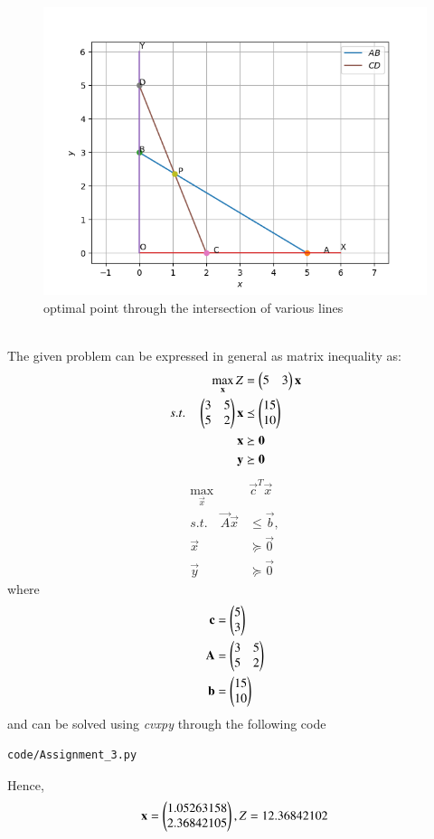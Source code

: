 \documentclass[journal,12pt,twocolumn]{IEEEtran}
\begin{document}
\begin{figure}[h]
\includegraphics[width=\columnwidth]{Figure_1.png}
\caption{optimal point through the intersection of various lines}
\label{fig:Figure_1}
\end{figure}\\
The given problem can be expressed in general as matrix inequality as:
\begin{align}
\max_{\mathbf{x}} Z &= \begin{pmatrix}5 & 3\end{pmatrix}\mathbf{x}
\\
s.t. \quad 
\begin{pmatrix}
3 & 5
\\
5 & 2
\end{pmatrix}
\mathbf{x} &\preceq \begin{pmatrix}15\\10\end{pmatrix}
\\
\mathbf{x} &\succeq \mathbf{0}\\
\mathbf{y} &\succeq \mathbf{0}
\end{align}
\begin{align}
\max_{\vec{x}} &\vec{c}^{T}\vec{x}
\\
s.t. \quad \vec{A}\vec{x} &\le \vec{b},
\\
\vec{x} &\succeq\vec{0}\\
\vec{y} &\succeq \vec{0}
\end{align}
%
where
\begin{align}
\vec{c} &= \myvec{5 \\ 3}
\\
\vec{A} &=
\myvec{
3 & 5
\\
5 & 2
}
\\
\vec{b}&=\myvec{15\\10}
%
\end{align}
%
and can be solved using {\em cvxpy} through the following code
\begin{lstlisting}
code/Assignment_3.py
\end{lstlisting}
Hence,
\begin{align}
\mathbf{x} = \begin{pmatrix}1.05263158\\2.36842105\end{pmatrix}, Z = 12.36842102
\end{align}
\end{document}
